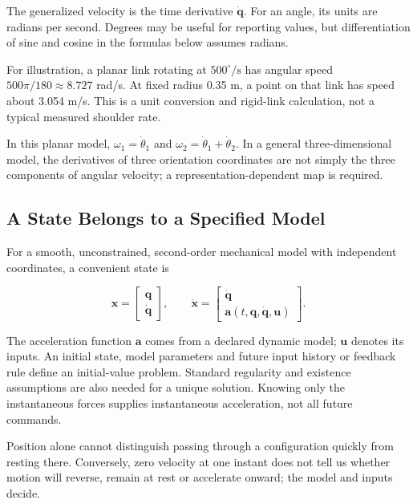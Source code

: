 \protect{}\label{ch02:angular-velocity}{} \protect{}\label{ch02:ref-Nesbit2005}{} \protect{}\label{ch02:ref-Hume2005}{}

The generalized velocity is the time derivative \(\dot{\bm q}\). For an angle, its units are radians per second. Degrees may be useful for reporting values, but differentiation of sine and cosine in the formulas below assumes radians.

For illustration, a planar link rotating at \(500^\circ/\mathrm{s}\) has angular speed \(500\pi/180\approx8.727\) rad/s. At fixed radius 0.35 m, a point on that link has speed about 3.054 m/s. This is a unit conversion and rigid-link calculation, not a typical measured shoulder rate.

In this planar model, \(\omega_1=\dot\theta_1\) and \(\omega_2=\dot\theta_1+\dot\theta_2\). In a general three-dimensional model, the derivatives of three orientation coordinates are not simply the three components of angular velocity; a representation-dependent map is required.

\subsection{A State Belongs to a Specified Model}\label{ch02:a-state-belongs-to-a-specified-model}

For a smooth, unconstrained, second-order mechanical model with independent coordinates, a convenient state is

\[
\bm x=
\begin{bmatrix}\bm q\\\dot{\bm q}\end{bmatrix},
\qquad
\dot{\bm x}=
\begin{bmatrix}\dot{\bm q}\\\bm a(t,\bm q,\dot{\bm q},\bm u)\end{bmatrix}.
\]

The acceleration function \(\bm a\) comes from a declared dynamic model; \(\bm u\) denotes its inputs. An initial state, model parameters and future input history or feedback rule define an initial-value problem. Standard regularity and existence assumptions are also needed for a unique solution. Knowing only the instantaneous forces supplies instantaneous acceleration, not all future commands.

Position alone cannot distinguish passing through a configuration quickly from resting there. Conversely, zero velocity at one instant does not tell us whether motion will reverse, remain at rest or accelerate onward; the model and inputs decide.

